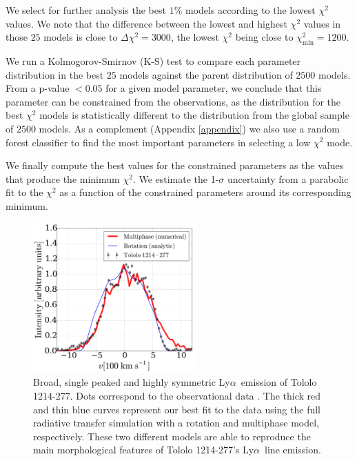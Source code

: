 \documentclass[a4,useAMS,usenatbib,usegraphicx]{mn2e}
\newcommand{\tol}{Tololo 1214-277}
\newcommand{\lya}{\ifmmode{{\rm Ly}\alpha}\else Ly$\alpha$\ \fi}
\begin{document}
We select for further analysis the best $1\%$ models according to the
lowest $\chi^2$ values.
We note that the difference between the lowest and highest $\chi^2$ values in
those $25$ models is close to $\Delta\chi^2 = 3000$, the lowest
$\chi^2$ being close to $\chi^2_{\mathrm{min}}=1200$. 

We run a Kolmogorov-Smirnov (K-S) test to compare each parameter
distribution in the best $25$ models against the parent distribution
of $2500$ models. 
From a p-value $<0.05$ for a given model parameter, we conclude that
this parameter can be constrained from the observations, as the distribution for
the best $\chi^2$ models is statistically different to the
distribution from the global sample of $2500$ models.  
As a complement (Appendix \ref{appendix}) we also use a random forest
classifier to find the most important parameters in selecting a low
$\chi^2$ mode.  


We finally compute the best values for the constrained parameters as
the values that produce the minimum $\chi^2$.  
We estimate the 1-$\sigma$ uncertainty from a parabolic fit to the
$\chi^2$ as a function of the constrained parameters around its
corresponding minimum.   



\begin{figure}
\begin{center}
\includegraphics[width=0.55\textwidth]{CLARA-TOL-main.pdf}
\caption{Broad, single peaked and highly symmetric \lya emission of \tol.
  Dots correspond to the observational data \citep{mashesse03}. 
The thick red and thin blue curves represent our best fit
to the data using the full radiative transfer simulation with a
rotation and multiphase model, respectively. 
These two different models are able to reproduce the main morphological
features of \tol's \lya line emission.\label{fig:results}}
\end{center}
\end{figure}
\end{document}
